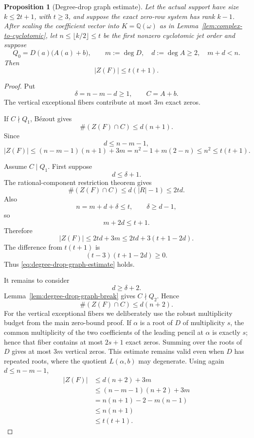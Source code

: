 \documentclass[11pt]{article}
\newtheorem{proposition}[theorem]{Proposition}
\newcommand{\Q}{\mathbb Q}
\begin{document}
\begin{proposition}[Degree-drop graph estimate]
\label{prop:degree-drop-graph-estimate}
Let the actual support have size \(k\le2t+1\), with \(t\ge3\),
and suppose the exact zero-row system has rank \(k-1\).  After scaling
the coefficient vector into \(K=\Q(\omega)\) as in
Lemma~\ref{lem:complex-to-cyclotomic}, let \(n\le\lfloor k/2\rfloor\le t\)
be the first nonzero cyclotomic jet order and suppose
\[
 Q_0=D(a)\bigl(A(a)+b\bigr),
 \qquad
 m:=\deg D,\quad d:=\deg A\ge2,\quad
 m+d<n.
\]
Then
\begin{equation}
 \boxed{|Z(F)|\le t(t+1).}
 \label{eq:degree-drop-graph-estimate}
\end{equation}
\end{proposition}

\begin{proof}
Put
\[
 \delta=n-m-d\ge1,
 \qquad
 C=A+b.
\]
The vertical exceptional fibers contribute at most \(3m\) exact zeros.

If \(C\nmid Q_1\), B\'ezout gives
\[
 \#(Z(F)\cap C)\le d(n+1).
\]
Since
\[
 d\le n-m-1,
\]
\[
 |Z(F)|
 \le
 (n-m-1)(n+1)+3m
 =
 n^2-1+m(2-n)
 \le n^2
 \le t(t+1).
\]

Assume \(C\mid Q_1\).
First suppose
\[
 d\le\delta+1.
\]
The rational-component restriction theorem gives
\[
 \#(Z(F)\cap C)
 \le
 d(|R|-1)
 \le2td.
\]
Also
\[
 n=m+d+\delta\le t,
 \qquad
 \delta\ge d-1,
\]
so
\[
 m+2d\le t+1.
\]
Therefore
\[
 |Z(F)|
 \le
 2td+3m
 \le
 2td+3(t+1-2d).
\]
The difference from \(t(t+1)\) is
\[
 (t-3)(t+1-2d)\ge0.
\]
Thus \eqref{eq:degree-drop-graph-estimate} holds.

It remains to consider
\[
 d\ge\delta+2.
\]
Lemma~\ref{lem:degree-drop-graph-break} gives \(C\nmid Q_2\).
Hence
\[
 \#(Z(F)\cap C)\le d(n+2).
\]
For the vertical exceptional fibers we deliberately use the robust
multiplicity budget from the main zero-bound proof.  If \(\alpha\) is a
root of \(D\) of multiplicity \(s\), the common multiplicity of the two
coefficients of the leading pencil at \(\alpha\) is exactly \(s\); hence
that fiber contains at most \(2s+1\) exact zeros.  Summing over the roots of
\(D\) gives at most \(3m\) vertical zeros.  This estimate remains valid even
when \(D\) has repeated roots, where the quotient \(L(\alpha,b)\) may
degenerate.
Using again \(d\le n-m-1\),
\[
 \begin{aligned}
 |Z(F)|
 &\le d(n+2)+3m\\
 &\le(n-m-1)(n+2)+3m\\
 &=n(n+1)-2-m(n-1)\\
 &\le n(n+1)\\
 &\le t(t+1).
 \end{aligned}
\]

\end{proof}
\end{document}
